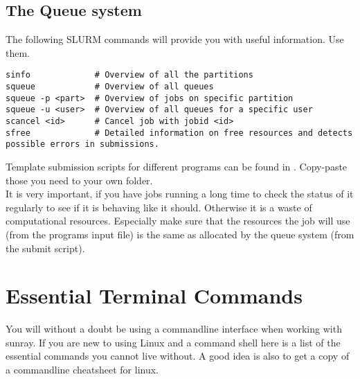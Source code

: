 \documentclass{article}
\begin{document}
\subsection*{The Queue system}

The following SLURM commands will provide you with useful information. Use them.

\begin{lstlisting}
sinfo             # Overview of all the partitions
squeue            # Overview of all queues
squeue -p <part>  # Overview of jobs on specific partition
squeue -u <user>  # Overview of all queues for a specific user
scancel <id>      # Cancel job with jobid <id>
sfree             # Detailed information on free resources and detects possible errors in submissions.
\end{lstlisting}

Template submission scripts for different programs can be found in .
Copy-paste those you need to your own  folder.\\

It is very important, if you have jobs running a long time to check the status of it regularly to see if it is behaving like it should.
Otherwise it is a waste of computational resources.
Especially make sure that the resources the job will use (from the programs input file) is the same as allocated by the queue system (from the submit script).\\



\newpage


\section{Essential Terminal Commands}

You will without a doubt be using a commandline interface when working with sunray.
If you are new to using Linux and a command shell here is a list of the essential commands you cannot live without.
A good idea is also to get a copy of a commandline cheatsheet for linux.\\
\end{document}
